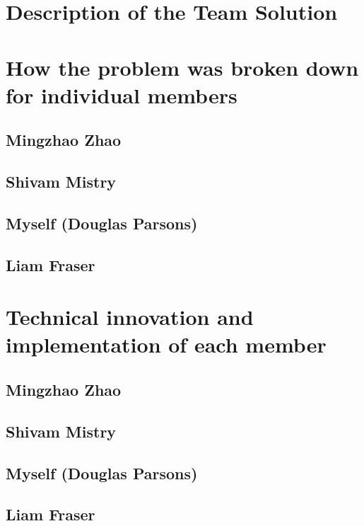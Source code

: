 \section{Description of the Team Solution}

\section{How the problem was broken down for individual members}

\subsection*{Mingzhao Zhao}

\subsection*{Shivam Mistry}

\subsection*{Myself (Douglas Parsons)}

\subsection*{Liam Fraser}

\section{Technical innovation and implementation of each member}

\subsection*{Mingzhao Zhao}

\subsection*{Shivam Mistry}

\subsection*{Myself (Douglas Parsons)}

\subsection*{Liam Fraser}
